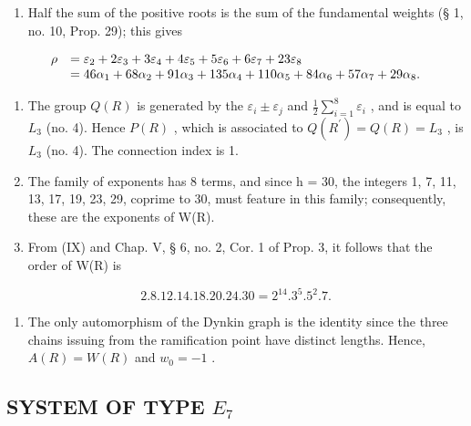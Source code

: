 \begin{enumerate}
\def\labelenumi{(\Roman{enumi})}
\setcounter{enumi}{6}
\tightlist
\item
  Half the sum of the positive roots is the sum of the fundamental weights (§ 1, no. 10, Prop. 29); this gives
\end{enumerate}

\[
\begin{array}{r l} \rho & = \varepsilon_ {2} + 2 \varepsilon_ {3} + 3 \varepsilon_ {4} + 4 \varepsilon_ {5} + 5 \varepsilon_ {6} + 6 \varepsilon_ {7} + 23 \varepsilon_ {8} \\ & = 46 \alpha_ {1} + 68 \alpha_ {2} + 91 \alpha_ {3} + 135 \alpha_ {4} + 110 \alpha_ {5} + 84 \alpha_ {6} + 57 \alpha_ {7} + 29 \alpha_ {8}. \end{array}
\]

\begin{enumerate}
\def\labelenumi{(\Roman{enumi})}
\setcounter{enumi}{7}
\item
  The group \(Q(R)\) is generated by the \(\varepsilon_{i} \pm \varepsilon_{j}\) and \(\frac{1}{2} \sum_{i=1}^{8} \varepsilon_{i}\) , and is equal to \(L_{3}\) (no. 4). Hence \(P(R)\) , which is associated to \(Q(R^{\prime}) = Q(R) = L_{3}\) , is \(L_{3}\) (no. 4). The connection index is 1.
\item
  The family of exponents has 8 terms, and since h = 30, the integers 1, 7, 11, 13, 17, 19, 23, 29, coprime to 30, must feature in this family; consequently, these are the exponents of W(R).
\item
  From (IX) and Chap. V, § 6, no. 2, Cor. 1 of Prop. 3, it follows that the order of W(R) is
\end{enumerate}

\[
2. 8. 12. 14. 18. 20. 24. 30 = 2 ^ {14}. 3 ^ {5}. 5 ^ {2}. 7.
\]

\begin{enumerate}
\def\labelenumi{(\Roman{enumi})}
\setcounter{enumi}{10}
\tightlist
\item
  The only automorphism of the Dynkin graph is the identity since the three chains issuing from the ramification point have distinct lengths. Hence, \(A(R) = W(R)\) and \(w_{0} = -1\) .
\end{enumerate}

\subsection{\texorpdfstring{SYSTEM OF TYPE \(E_{7}\)}{SYSTEM OF TYPE E\_7}}

